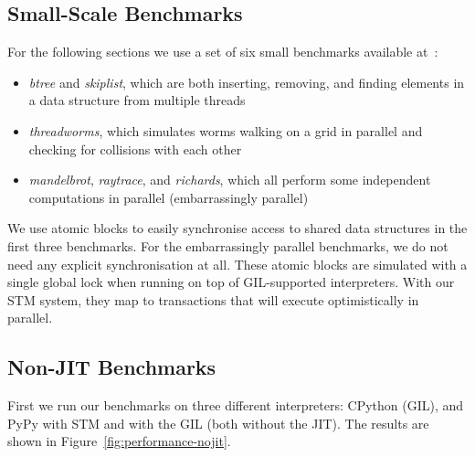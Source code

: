 \documentclass{sigplanconf}
\newcommand{\mynote}[2]{%
  \textcolor{red}{%
    \fbox{\bfseries\sffamily\scriptsize#1}%
    {\small$\blacktriangleright$\textsf{\emph{#2}}$\blacktriangleleft$}%
  }%
}
\newcommand\remi[1]{\mynote{Remi}{#1}}
\begin{document}
\subsection{Small-Scale Benchmarks\label{sec:performance-bench}}

For the following sections we use a set of six small benchmarks
available at~\cite{pypybenchs}:

\begin{itemize}
\item \emph{btree} and \emph{skiplist}, which are both inserting,
  removing, and finding elements in a data structure from multiple
  threads
\item \emph{threadworms}, which simulates worms walking on a grid in
  parallel and checking for collisions with each other
\item \emph{mandelbrot}, \emph{raytrace}, and \emph{richards}, which
  all perform some independent computations in parallel (embarrassingly
  parallel)
\end{itemize}

We use atomic blocks to easily synchronise access to shared
data structures in the first three benchmarks. For the embarrassingly
parallel benchmarks, we do not need any explicit synchronisation at
all. These atomic blocks are simulated with a single global lock
when running on top of GIL-supported interpreters. With our STM
system, they map to transactions that will execute optimistically
in parallel.









\subsection{Non-JIT Benchmarks}
First we run our benchmarks on three different interpreters: CPython
(GIL), and PyPy with STM and with the GIL (both without the JIT). The
results are shown in Figure~\ref{fig:performance-nojit}.
\end{document}
